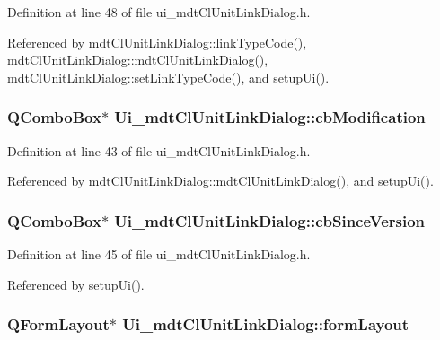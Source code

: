 Definition at line 48 of file ui\-\_\-mdt\-Cl\-Unit\-Link\-Dialog.\-h.



Referenced by mdt\-Cl\-Unit\-Link\-Dialog\-::link\-Type\-Code(), mdt\-Cl\-Unit\-Link\-Dialog\-::mdt\-Cl\-Unit\-Link\-Dialog(), mdt\-Cl\-Unit\-Link\-Dialog\-::set\-Link\-Type\-Code(), and setup\-Ui().

\hypertarget{class_ui__mdt_cl_unit_link_dialog_ad6114a32abcca7a6780dbda5ceb14f0b}{
\subsubsection[{cb\-Modification}]{\setlength{\rightskip}{0pt plus 5cm}Q\-Combo\-Box$\ast$ Ui\-\_\-mdt\-Cl\-Unit\-Link\-Dialog\-::cb\-Modification}}\label{class_ui__mdt_cl_unit_link_dialog_ad6114a32abcca7a6780dbda5ceb14f0b}


Definition at line 43 of file ui\-\_\-mdt\-Cl\-Unit\-Link\-Dialog.\-h.



Referenced by mdt\-Cl\-Unit\-Link\-Dialog\-::mdt\-Cl\-Unit\-Link\-Dialog(), and setup\-Ui().

\hypertarget{class_ui__mdt_cl_unit_link_dialog_a7047e8b391f10f9526515a0daaed5254}{
\subsubsection[{cb\-Since\-Version}]{\setlength{\rightskip}{0pt plus 5cm}Q\-Combo\-Box$\ast$ Ui\-\_\-mdt\-Cl\-Unit\-Link\-Dialog\-::cb\-Since\-Version}}\label{class_ui__mdt_cl_unit_link_dialog_a7047e8b391f10f9526515a0daaed5254}


Definition at line 45 of file ui\-\_\-mdt\-Cl\-Unit\-Link\-Dialog.\-h.



Referenced by setup\-Ui().

\hypertarget{class_ui__mdt_cl_unit_link_dialog_a0515f1c71b7504f718835d9fe91ea18f}{
\subsubsection[{form\-Layout}]{\setlength{\rightskip}{0pt plus 5cm}Q\-Form\-Layout$\ast$ Ui\-\_\-mdt\-Cl\-Unit\-Link\-Dialog\-::form\-Layout}}\label{class_ui__mdt_cl_unit_link_dialog_a0515f1c71b7504f718835d9fe91ea18f}


